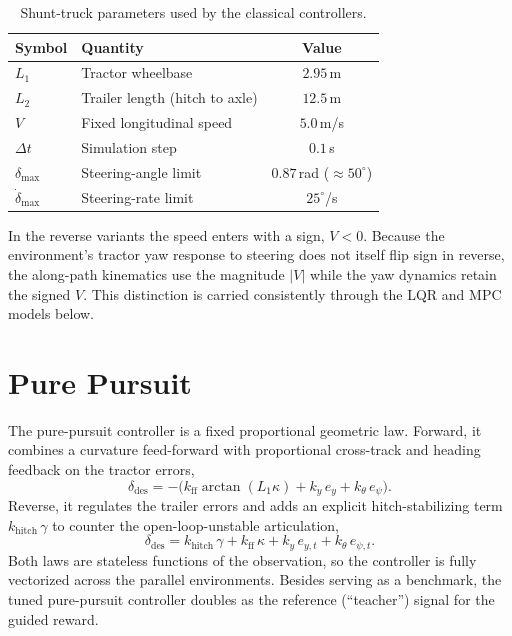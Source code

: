 \begin{table}[H]
\centering
\caption{Shunt-truck parameters used by the classical controllers.}
\label{tab:app_cc_params}
\begin{tabular}{llc}
\toprule
Symbol & Quantity & Value \\
\midrule
$L_1$ & Tractor wheelbase & $2.95$\,m \\
$L_2$ & Trailer length (hitch to axle) & $12.5$\,m \\
$V$ & Fixed longitudinal speed & $5.0$\,m/s \\
$\Delta t$ & Simulation step & $0.1$\,s \\
$\delta_{\max}$ & Steering-angle limit & $0.87$\,rad ($\approx 50^{\circ}$) \\
$\dot{\delta}_{\max}$ & Steering-rate limit & $25^{\circ}$/s \\
\bottomrule
\end{tabular}
\end{table}

In the reverse variants the speed enters with a sign, $V < 0$. Because the environment's
tractor yaw response to steering does not itself flip sign in reverse, the along-path
kinematics use the magnitude $\lvert V \rvert$ while the yaw dynamics retain the signed
$V$. This distinction is carried consistently through the LQR and MPC models below.

\section{Pure Pursuit}
\label{sec:app_cc_pp}

The pure-pursuit controller \cite{coulter1992pure} is a fixed proportional geometric law.
Forward, it combines a curvature feed-forward with proportional cross-track and heading
feedback on the tractor errors,
\begin{equation}
    \delta_{\mathrm{des}} = -\bigl(k_{\mathrm{ff}} \arctan(L_1 \kappa)
    + k_y\, e_y + k_\theta\, e_\psi\bigr).
    \label{eq:app_cc_pp_fwd}
\end{equation}
Reverse, it regulates the trailer errors and adds an explicit hitch-stabilizing term
$k_{\mathrm{hitch}}\,\gamma$ to counter the open-loop-unstable articulation,
\begin{equation}
    \delta_{\mathrm{des}} = k_{\mathrm{hitch}}\,\gamma + k_{\mathrm{ff}}\,\kappa
    + k_y\, e_{y,t} + k_\theta\, e_{\psi,t}.
    \label{eq:app_cc_pp_rev}
\end{equation}
Both laws are stateless functions of the observation, so the controller is fully
vectorized across the parallel environments. Besides serving as a benchmark, the tuned
pure-pursuit controller doubles as the reference (``teacher'') signal for the guided
reward.

